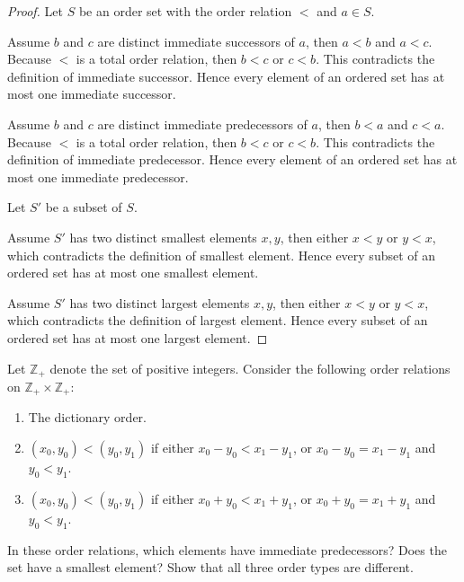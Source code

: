 \begin{proof}
    Let $S$ be an order set with the order relation $<$ and $a\in S$.

    Assume $b$ and $c$ are distinct immediate successors of $a$, then $a < b$ and $a < c$. Because $<$ is a total order relation, then $b < c$ or $c < b$. This contradicts the definition of immediate successor. Hence every element of an ordered set has at most one immediate successor.

    Assume $b$ and $c$ are distinct immediate predecessors of $a$, then $b < a$ and $c < a$. Because $<$ is a total order relation, then $b < c$ or $c < b$. This contradicts the definition of immediate predecessor. Hence every element of an ordered set has at most one immediate predecessor.

    Let $S'$ be a subset of $S$.

    Assume $S'$ has two distinct smallest elements $x, y$, then either $x < y$ or $y < x$, which contradicts the definition of smallest element. Hence every subset of an ordered set has at most one smallest element.

    Assume $S'$ has two distinct largest elements $x, y$, then either $x < y$ or $y < x$, which contradicts the definition of largest element. Hence every subset of an ordered set has at most one largest element.
\end{proof}

\begin{exercise}\label{chapter1:section3:exercise12}
    Let $\mathbb{Z}_{+}$ denote the set of positive integers. Consider the following order relations on $\mathbb{Z}_{+}\times\mathbb{Z}_{+}$:
    \begin{enumerate}[label={(\roman*)}]
        \item The dictionary order.
        \item $(x_{0}, y_{0}) < (y_{0}, y_{1})$ if either $x_{0} - y_{0} < x_{1} - y_{1}$, or $x_{0} - y_{0} = x_{1} - y_{1}$ and $y_{0} < y_{1}$.
        \item $(x_{0}, y_{0}) < (y_{0}, y_{1})$ if either $x_{0} + y_{0} < x_{1} + y_{1}$, or $x_{0} + y_{0} = x_{1} + y_{1}$ and $y_{0} < y_{1}$.
    \end{enumerate}

    In these order relations, which elements have immediate predecessors? Does the set have a smallest element? Show that all three order types are different.
\end{exercise}

